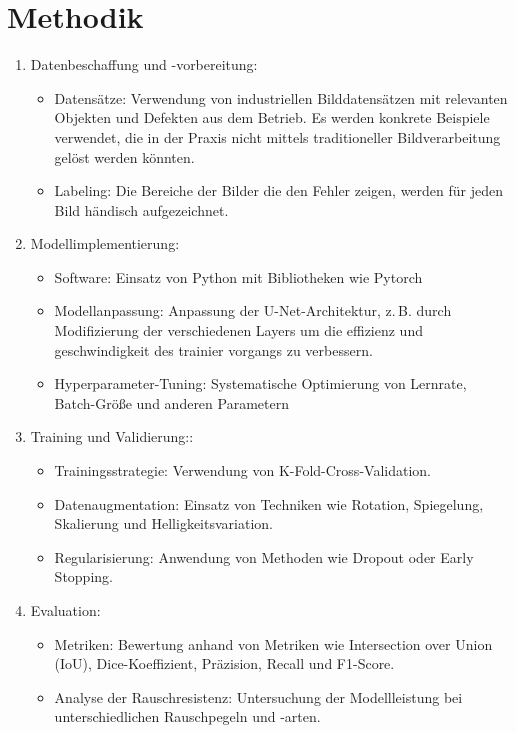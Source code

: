 \chapter{Methodik}\label{sec:exp_methodik}
\begin{enumerate}
    \item Datenbeschaffung und -vorbereitung:
    
    \begin{itemize}
        \item Datensätze: Verwendung von industriellen Bilddatensätzen mit relevanten Objekten und Defekten aus dem Betrieb. Es werden konkrete Beispiele verwendet, die in der Praxis nicht mittels traditioneller Bildverarbeitung gelöst werden könnten.
        \item Labeling: Die Bereiche der Bilder die den Fehler zeigen, werden für jeden Bild händisch aufgezeichnet.
    \end{itemize}
    
    \item Modellimplementierung:
    \begin{itemize}
        \item Software: Einsatz von Python mit Bibliotheken wie Pytorch
        \item Modellanpassung: Anpassung der U-Net-Architektur, z. B. durch Modifizierung der verschiedenen Layers um die effizienz und geschwindigkeit des trainier vorgangs zu verbessern.
        \item Hyperparameter-Tuning: Systematische Optimierung von Lernrate, Batch-Größe und anderen Parametern
    \end{itemize}
    
    \item Training und Validierung::
    \begin{itemize}
        \item Trainingsstrategie:  Verwendung von K-Fold-Cross-Validation.
        \item Datenaugmentation: Einsatz von Techniken wie Rotation, Spiegelung, Skalierung und Helligkeitsvariation.
        \item Regularisierung: Anwendung von Methoden wie Dropout oder Early Stopping.
    \end{itemize}

    \item Evaluation:
    \begin{itemize}
        \item Metriken: Bewertung anhand von Metriken wie Intersection over Union (IoU), Dice-Koeffizient, Präzision, Recall und F1-Score.
        \item Analyse der Rauschresistenz: Untersuchung der Modellleistung bei unterschiedlichen Rauschpegeln und -arten.
    \end{itemize}
    

\end{enumerate}
